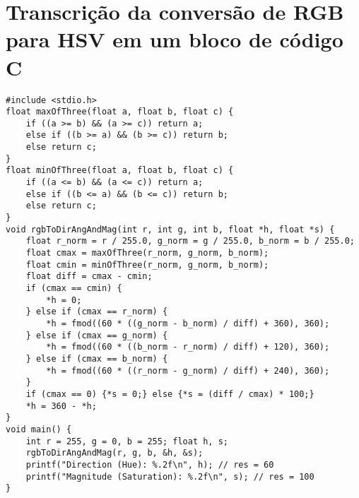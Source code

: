 

\chapter{Transcrição da conversão de RGB para HSV em um bloco de código C \label{rgb_to_hsv}}

\lstset{language=C}
\begin{lstlisting}
#include <stdio.h>
float maxOfThree(float a, float b, float c) {
	if ((a >= b) && (a >= c)) return a;
	else if ((b >= a) && (b >= c)) return b;
	else return c;
}
float minOfThree(float a, float b, float c) {
	if ((a <= b) && (a <= c)) return a;
	else if ((b <= a) && (b <= c)) return b;
	else return c;
}
void rgbToDirAngAndMag(int r, int g, int b, float *h, float *s) {
	float r_norm = r / 255.0, g_norm = g / 255.0, b_norm = b / 255.0;
	float cmax = maxOfThree(r_norm, g_norm, b_norm);
	float cmin = minOfThree(r_norm, g_norm, b_norm);
	float diff = cmax - cmin;
	if (cmax == cmin) {
		*h = 0;
	} else if (cmax == r_norm) {
		*h = fmod((60 * ((g_norm - b_norm) / diff) + 360), 360);
	} else if (cmax == g_norm) {
		*h = fmod((60 * ((b_norm - r_norm) / diff) + 120), 360);
	} else if (cmax == b_norm) {
		*h = fmod((60 * ((r_norm - g_norm) / diff) + 240), 360);
	}
	if (cmax == 0) {*s = 0;} else {*s = (diff / cmax) * 100;}
	*h = 360 - *h;
}
void main() {
	int r = 255, g = 0, b = 255; float h, s;
	rgbToDirAngAndMag(r, g, b, &h, &s);
	printf("Direction (Hue): %.2f\n", h); // res = 60
	printf("Magnitude (Saturation): %.2f\n", s); // res = 100
}
	
\end{lstlisting}